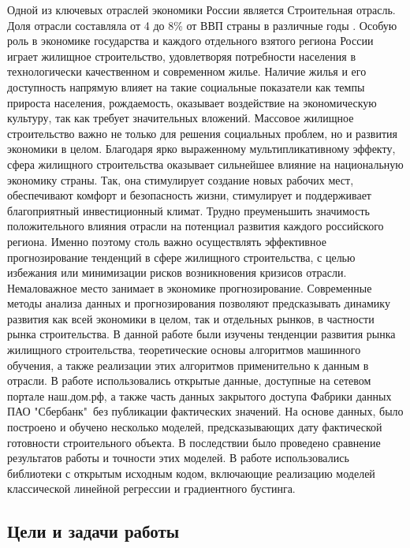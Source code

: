 \documentclass[12pt,a4paper]{article} %
\begin{document}
Одной из ключевых отраслей экономики России является Строительная отрасль. Доля отрасли составляла от 4 до 8\% от ВВП страны в различные годы \cite{stroyStat}. Особую роль в экономике государства и каждого отдельного взятого региона России играет жилищное строительство, удовлетворяя потребности населения в технологически качественном и современном жилье. Наличие жилья и его доступность напрямую влияет на такие социальные показатели как темпы прироста населения, рождаемость, оказывает воздействие на экономическую культуру, так как требует значительных вложений. Массовое жилищное строительство важно не только для решения социальных проблем, но и развития экономики в целом. 
Благодаря ярко выраженному мультипликативному эффекту, сфера жилищного строительства оказывает сильнейшее влияние на национальную экономику страны. Так, она стимулирует создание новых рабочих мест, обеспечивают комфорт и безопасность жизни, стимулирует и поддерживает благоприятный инвестиционный климат. Трудно преуменьшить значимость положительного влияния отрасли на потенциал развития каждого российского региона. Именно поэтому столь важно осуществлять эффективное прогнозирование тенденций в сфере жилищного строительства, с целью избежания или минимизации рисков возникновения кризисов отрасли. 
Немаловажное место занимает в экономике прогнозирование. Современные методы анализа данных и прогнозирования позволяют предсказывать динамику развития как всей экономики в целом, так и отдельных рынков, в частности рынка строительства. В данной работе были изучены тенденции развития рынка жилищного строительства, теоретические основы алгоритмов машинного обучения, а также реализации этих алгоритмов применительно к  данным в отрасли. В работе использовались открытые данные, доступные на сетевом портале наш.дом.рф, а также часть данных закрытого доступа Фабрики данных ПАО "Сбербанк"\ без публикации фактических значений. На основе данных, было построено и обучено несколько моделей, предсказывающих дату фактической готовности строительного объекта. В последствии было проведено сравнение результатов работы и точности этих моделей. В работе использовались библиотеки с открытым исходным кодом, включающие реализацию моделей классической линейной регрессии и градиентного бустинга.

\newpage
\subsection{Цели и задачи работы}
\end{document}
